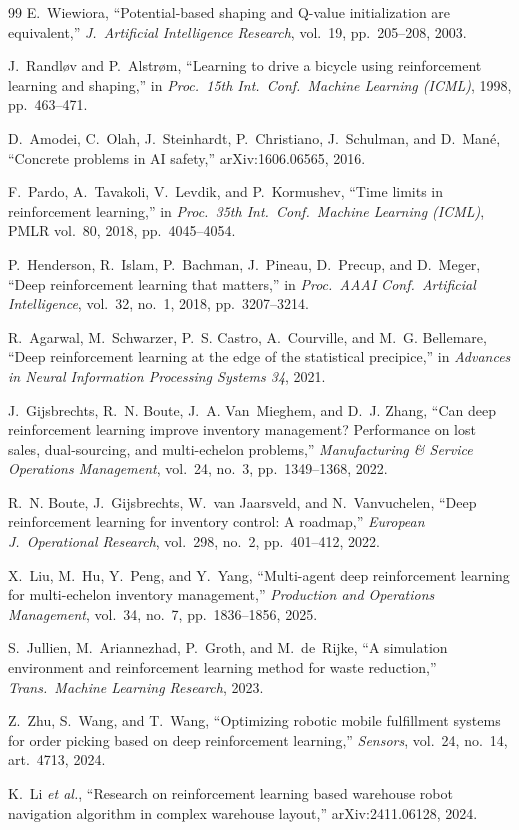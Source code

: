 \begin{thebibliography}{99}
E.~Wiewiora, ``Potential-based shaping and Q-value initialization are equivalent,'' \emph{J.\ Artificial Intelligence Research}, vol.~19, pp.~205--208, 2003.

J.~Randl{\o}v and P.~Alstr{\o}m, ``Learning to drive a bicycle using reinforcement learning and shaping,'' in \emph{Proc.\ 15th Int.\ Conf.\ Machine Learning (ICML)}, 1998, pp.~463--471.

D.~Amodei, C.~Olah, J.~Steinhardt, P.~Christiano, J.~Schulman, and D.~Man{\'e}, ``Concrete problems in AI safety,'' arXiv:1606.06565, 2016.

F.~Pardo, A.~Tavakoli, V.~Levdik, and P.~Kormushev, ``Time limits in reinforcement learning,'' in \emph{Proc.\ 35th Int.\ Conf.\ Machine Learning (ICML)}, PMLR vol.~80, 2018, pp.~4045--4054.

P.~Henderson, R.~Islam, P.~Bachman, J.~Pineau, D.~Precup, and D.~Meger, ``Deep reinforcement learning that matters,'' in \emph{Proc.\ AAAI Conf.\ Artificial Intelligence}, vol.~32, no.~1, 2018, pp.~3207--3214.

R.~Agarwal, M.~Schwarzer, P.~S. Castro, A.~Courville, and M.~G. Bellemare, ``Deep reinforcement learning at the edge of the statistical precipice,'' in \emph{Advances in Neural Information Processing Systems 34}, 2021.

J.~Gijsbrechts, R.~N. Boute, J.~A. Van~Mieghem, and D.~J. Zhang, ``Can deep reinforcement learning improve inventory management? Performance on lost sales, dual-sourcing, and multi-echelon problems,'' \emph{Manufacturing \& Service Operations Management}, vol.~24, no.~3, pp.~1349--1368, 2022.

R.~N. Boute, J.~Gijsbrechts, W.~van Jaarsveld, and N.~Vanvuchelen, ``Deep reinforcement learning for inventory control: A roadmap,'' \emph{European J.\ Operational Research}, vol.~298, no.~2, pp.~401--412, 2022.

X.~Liu, M.~Hu, Y.~Peng, and Y.~Yang, ``Multi-agent deep reinforcement learning for multi-echelon inventory management,'' \emph{Production and Operations Management}, vol.~34, no.~7, pp.~1836--1856, 2025.

S.~Jullien, M.~Ariannezhad, P.~Groth, and M.~de~Rijke, ``A simulation environment and reinforcement learning method for waste reduction,'' \emph{Trans.\ Machine Learning Research}, 2023.

Z.~Zhu, S.~Wang, and T.~Wang, ``Optimizing robotic mobile fulfillment systems for order picking based on deep reinforcement learning,'' \emph{Sensors}, vol.~24, no.~14, art.~4713, 2024.

K.~Li \emph{et al.}, ``Research on reinforcement learning based warehouse robot navigation algorithm in complex warehouse layout,'' arXiv:2411.06128, 2024.

\end{thebibliography}
